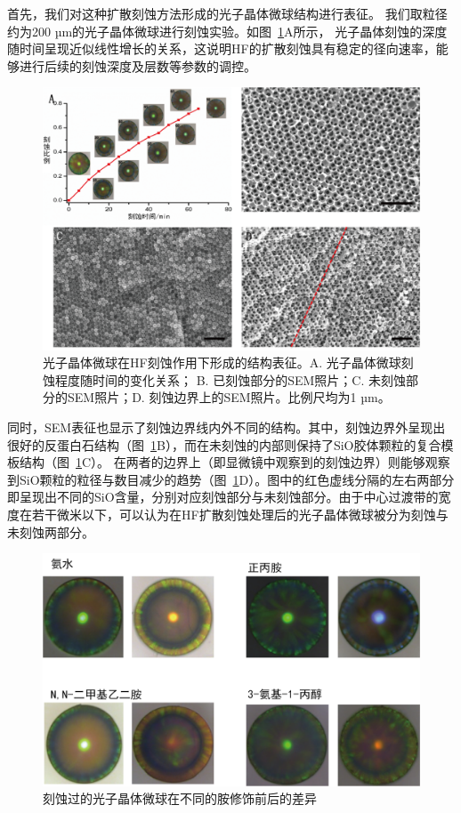 首先，我们对这种扩散刻蚀方法形成的光子晶体微球结构进行表征。
我们取粒径约为200 µm的光子晶体微球进行刻蚀实验。如图~\ref{fig:etch-exp}A所示，
光子晶体刻蚀的深度随时间呈现近似线性增长的关系，这说明HF的扩散刻蚀具有稳定的径向速率，能够进行后续的刻蚀深度及层数等参数的调控。
\begin{figure}[htbp]
  \centering
  \includegraphics[width=\linewidth]{figures/ch5/Etching-exp.png}
  \caption{光子晶体微球在HF刻蚀作用下形成的结构表征。A. 光子晶体微球刻蚀程度随时间的变化关系； B. 已刻蚀部分的SEM照片；C. 未刻蚀部分的SEM照片；D. 刻蚀边界上的SEM照片。比例尺均为1 µm。}
  \label{fig:etch-exp}
\end{figure}

同时，SEM表征也显示了刻蚀边界线内外不同的结构。其中，刻蚀边界外呈现出很好的反蛋白石结构（图~\ref{fig:etch-exp}B），而在未刻蚀的内部则保持了SiO胶体颗粒的复合模板结构（图~\ref{fig:etch-exp}C）。
在两者的边界上（即显微镜中观察到的刻蚀边界）则能够观察到SiO颗粒的粒径与数目减少的趋势（图~\ref{fig:etch-exp}D）。图中的红色虚线分隔的左右两部分即呈现出不同的SiO含量，分别对应刻蚀部分与未刻蚀部分。由于中心过渡带的宽度在若干微米以下，可以认为在HF扩散刻蚀处理后的光子晶体微球被分为刻蚀与未刻蚀两部分。

\begin{figure}[htbp]
  \centering
  \includegraphics[width=\linewidth]{figures/ch5/etch-reaction-1.png}
  \caption{刻蚀过的光子晶体微球在不同的胺修饰前后的差异}
  \label{fig:etch-reaction-1}
\end{figure}

